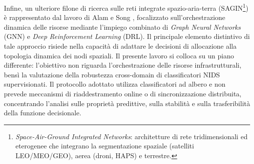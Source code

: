Infine, un ulteriore filone di ricerca sulle reti integrate spazio-aria-terra (SAGIN\footnote{\textit{Space-Air-Ground Integrated Networks}: architetture di rete tridimensionali ed eterogenee che integrano la segmentazione spaziale (satelliti LEO/MEO/GEO), aerea (droni, HAPS) e terrestre.}) è rappresentato dal lavoro di Alam e Song \cite{alam2024}, focalizzato sull'orchestrazione dinamica delle risorse mediante l'impiego combinato di \textit{Graph Neural Networks} (GNN) e \textit{Deep Reinforcement Learning} (DRL). 
Il principale elemento distintivo di tale approccio risiede nella capacità di adattare le decisioni di allocazione alla topologia dinamica dei nodi spaziali. 
Il presente lavoro si colloca su un piano differente: l'obiettivo non riguarda l'orchestrazione delle risorse infrastrutturali, bensì la valutazione della robustezza cross-domain di classificatori NIDS supervisionati. 
Il protocollo adottato utilizza classificatori ad albero e non prevede meccanismi di riaddestramento online o di sincronizzazione distribuita, concentrando l'analisi sulle proprietà predittive, sulla stabilità e sulla trasferibilità della funzione decisionale.

